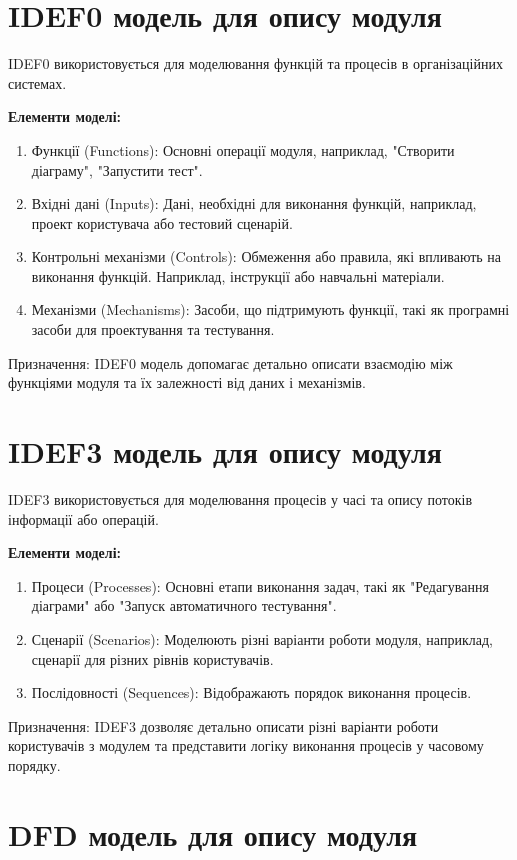 \documentclass[oneside,14pt]{extarticle}
\begin{document}
\begin{normalsize}
	\section*{IDEF0 модель для опису модуля}
	IDEF0 використовується для моделювання функцій та процесів в організаційних системах.
	
	\textbf{Елементи моделі:}
	\begin{enumerate}
		\item Функції (Functions): Основні операції модуля, наприклад, "Створити діаграму", "Запустити тест".
		\item Вхідні дані (Inputs): Дані, необхідні для виконання функцій, наприклад, проект користувача або тестовий сценарій.
		\item Контрольні механізми (Controls): Обмеження або правила, які впливають на виконання функцій. Наприклад, інструкції або навчальні матеріали.
		\item Механізми (Mechanisms): Засоби, що підтримують функції, такі як програмні засоби для проектування та тестування.
	\end{enumerate}
	Призначення:
	IDEF0 модель допомагає детально описати взаємодію між функціями модуля та їх залежності від даних і механізмів.
	
	\section*{IDEF3 модель для опису модуля}
	IDEF3 використовується для моделювання процесів у часі та опису потоків інформації або операцій.
	
	\textbf{Елементи моделі:}
	\begin{enumerate}
		\item Процеси (Processes): Основні етапи виконання задач, такі як "Редагування діаграми" або "Запуск автоматичного тестування".
		\item Сценарії (Scenarios): Моделюють різні варіанти роботи модуля, наприклад, сценарії для різних рівнів користувачів.
		\item Послідовності (Sequences): Відображають порядок виконання процесів.
	\end{enumerate}
	
	Призначення:
	IDEF3 дозволяє детально описати різні варіанти роботи користувачів з модулем та представити логіку виконання процесів у часовому порядку.
	
	\section*{DFD модель для опису модуля}
	

\end{normalsize}
\end{document}
